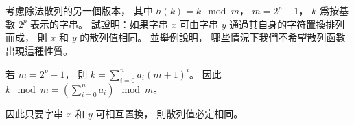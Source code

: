 \startEXERCISE
考慮除法散列的另一個版本，
其中 $h(k) = k \mod m$， $m=2^p-1$，
 $k$ 爲按基數 $2^p$ 表示的字串。
試證明：如果字串 $x$ 可由字串 $y$ 通過其自身的字符置換排列而成，
則 $x$ 和 $y$ 的散列值相同。
並舉例說明，
哪些情況下我們不希望散列函數出現這種性質。
\stopEXERCISE

\startANSWER
若 $m=2^p-1$，
則 $k = \sum_{i=0}^{n}a_i(m+1)^i$。
因此 $k \mod m = \left(\sum_{i=0}^{n}a_i\right)\mod m$。

因此只要字串 $x$ 和 $y$ 可相互置換，
則散列值必定相同。
\stopANSWER
